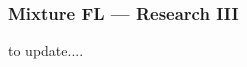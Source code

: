 
\begin{frame}
\frametitle{Mixture FL --- Research III}

to update....

\end{frame}


























